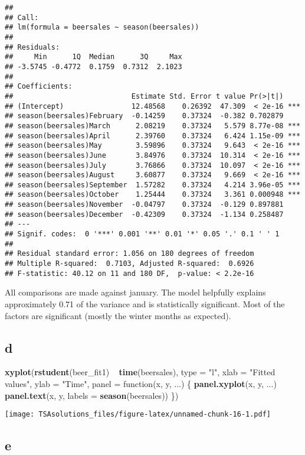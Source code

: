 \documentclass[]{book}
\newenvironment{Shaded}{\begin{snugshade}}{\end{snugshade}}
\newcommand{\KeywordTok}[1]{\textcolor[rgb]{0.13,0.29,0.53}{\textbf{{#1}}}}
\newcommand{\DataTypeTok}[1]{\textcolor[rgb]{0.13,0.29,0.53}{{#1}}}
\newcommand{\StringTok}[1]{\textcolor[rgb]{0.31,0.60,0.02}{{#1}}}
\newcommand{\NormalTok}[1]{{#1}}
\begin{document}
\begin{verbatim}
## 
## Call:
## lm(formula = beersales ~ season(beersales))
## 
## Residuals:
##     Min      1Q  Median      3Q     Max 
## -3.5745 -0.4772  0.1759  0.7312  2.1023 
## 
## Coefficients:
##                            Estimate Std. Error t value Pr(>|t|)    
## (Intercept)                12.48568    0.26392  47.309  < 2e-16 ***
## season(beersales)February  -0.14259    0.37324  -0.382 0.702879    
## season(beersales)March      2.08219    0.37324   5.579 8.77e-08 ***
## season(beersales)April      2.39760    0.37324   6.424 1.15e-09 ***
## season(beersales)May        3.59896    0.37324   9.643  < 2e-16 ***
## season(beersales)June       3.84976    0.37324  10.314  < 2e-16 ***
## season(beersales)July       3.76866    0.37324  10.097  < 2e-16 ***
## season(beersales)August     3.60877    0.37324   9.669  < 2e-16 ***
## season(beersales)September  1.57282    0.37324   4.214 3.96e-05 ***
## season(beersales)October    1.25444    0.37324   3.361 0.000948 ***
## season(beersales)November  -0.04797    0.37324  -0.129 0.897881    
## season(beersales)December  -0.42309    0.37324  -1.134 0.258487    
## ---
## Signif. codes:  0 '***' 0.001 '**' 0.01 '*' 0.05 '.' 0.1 ' ' 1
## 
## Residual standard error: 1.056 on 180 degrees of freedom
## Multiple R-squared:  0.7103, Adjusted R-squared:  0.6926 
## F-statistic: 40.12 on 11 and 180 DF,  p-value: < 2.2e-16
\end{verbatim}

All comparisons are made against january. The model helpfully explains
approximately 0.71 of the variance and is statistically significant.
Most of the factors are significant (mostly the winter months as
expected).

\subsection*{d}\label{d-3}

\begin{Shaded}
\begin{Highlighting}[]
\KeywordTok{xyplot}\NormalTok{(}\KeywordTok{rstudent}\NormalTok{(beer_fit1) ~}\StringTok{ }\KeywordTok{time}\NormalTok{(beersales), }\DataTypeTok{type =} \StringTok{"l"}\NormalTok{,}
       \DataTypeTok{xlab =} \StringTok{"Fitted values"}\NormalTok{, }\DataTypeTok{ylab =} \StringTok{"Time"}\NormalTok{,}
       \DataTypeTok{panel =} \NormalTok{function(x, y, ...) \{}
         \KeywordTok{panel.xyplot}\NormalTok{(x, y, ...)}
         \KeywordTok{panel.text}\NormalTok{(x, y, }\DataTypeTok{labels =} \KeywordTok{season}\NormalTok{(beersales))}
       \NormalTok{\})}
\end{Highlighting}
\end{Shaded}

\texttt{[image: TSAsolutions\_files/figure-latex/unnamed-chunk-16-1.pdf]}

\subsection*{e}\label{e-2}
\end{document}
